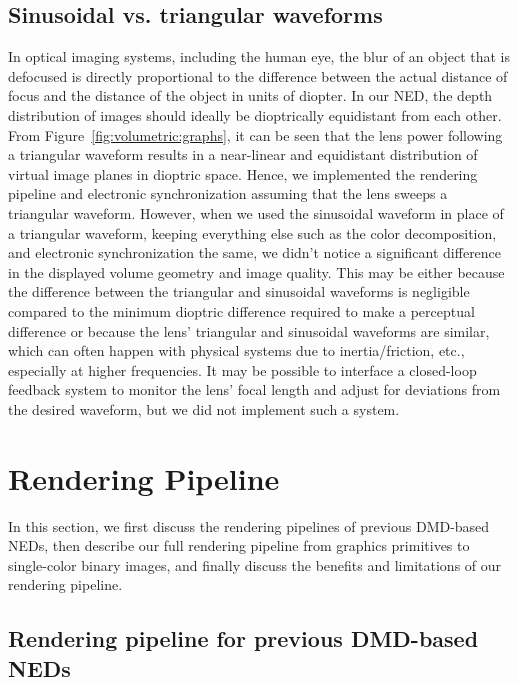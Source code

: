 \subsection{Sinusoidal vs. triangular waveforms}
\label{sec:volumetric:sinusoidal_vs_triangular}
In optical imaging systems, including the human eye, the blur of an object that is defocused is directly proportional to the difference between the actual distance of focus and the distance of the object in units of diopter. In our NED, the depth distribution of images should ideally be dioptrically equidistant from each other. From Figure~\ref{fig:volumetric:graphs}, it can be seen that the lens power following a triangular waveform results in a near-linear and equidistant distribution of virtual image planes in dioptric space. Hence, we implemented the rendering pipeline and electronic synchronization assuming that the lens sweeps a triangular waveform. However, when we used the sinusoidal waveform in place of a triangular waveform, keeping everything else such as the color decomposition, and electronic synchronization the same, we didn't notice a significant difference in the displayed volume geometry and image quality. This may be either because the difference between the triangular and sinusoidal waveforms is negligible compared to the minimum dioptric difference required to make a perceptual difference or because the lens' triangular and sinusoidal waveforms are similar, which can often happen with physical systems due to inertia/friction, etc., especially at higher frequencies. It may be possible to interface a closed-loop feedback system to monitor the lens' focal length and adjust for deviations from the desired waveform, but we did not implement such a system.

\section{Rendering Pipeline}
\label{sec:volumetric:rendering_pipeline}
In this section, we first discuss the rendering pipelines of previous DMD-based NEDs, then describe our full rendering pipeline from graphics primitives to single-color binary images, and finally discuss the benefits and limitations of our rendering pipeline.

\subsection{Rendering pipeline for previous DMD-based NEDs}
\label{sec:volumetric:previous_rendering_pipeline}


